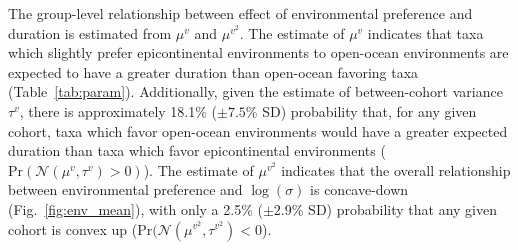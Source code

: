 \documentclass[11pt]{article}
\begin{document}
The group-level relationship between effect of environmental preference and duration is estimated from \(\mu^{v}\) and \(\mu^{v^{2}}\). The estimate of \(\mu^{v}\) indicates that taxa which slightly prefer epicontinental environments to open-ocean environments are expected to have a greater duration than open-ocean favoring taxa (Table~\ref{tab:param}). Additionally, given the estimate of between-cohort variance \(\tau^{v}\), there is approximately 18.1\% (\(\pm 7.5\%\) SD) probability that, for any given cohort, taxa which favor open-ocean environments would have a greater expected duration than taxa which favor epicontinental environments (\(\mathrm{Pr}(\mathcal{N}(\mu^{v}, \tau^{v}) > 0)\)). The estimate of \(\mu^{v^{2}}\) indicates that the overall relationship between environmental preference and \(\log(\sigma)\) is concave-down (Fig.~\ref{fig:env_mean}), with only a 2.5\% (\(\pm 2.9\%\) SD) probability that any given cohort is convex up (\(\mathrm{Pr}(\mathcal{N}(\mu^{v^{2}}, \tau^{v^{2}}) < 0\)).

\end{document}
